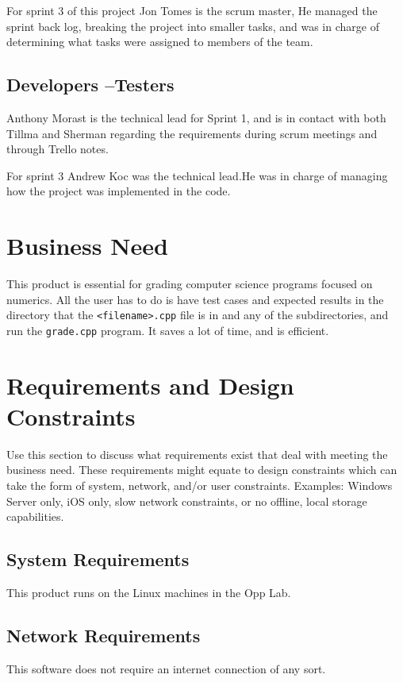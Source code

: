 For sprint 3 of this project Jon Tomes is the scrum master, He managed the sprint back log, breaking the project into smaller tasks, and was in charge of determining what tasks were assigned to members of the team.



\subsection{Developers --Testers}
Anthony Morast is the technical lead for Sprint 1, and is in contact with both Tillma and Sherman regarding the requirements during scrum meetings and through Trello notes. 

For sprint 3 Andrew Koc was the technical lead.He was in charge of managing how the project was implemented in the code. 


\section{Business Need}
This product is essential for grading computer science programs focused on numerics. All the user has to do is have test cases and expected results in the directory that the {\tt <filename>.cpp} file is in and any of the subdirectories, and run the {\tt grade.cpp} program. It saves a lot of time, and is efficient. 

\section{Requirements and Design Constraints}
Use this section to discuss what requirements exist that deal with meeting the 
business need.  These requirements might equate to design constraints which can 
take the form of system, network, and/or user constraints.  Examples:  Windows 
Server only, iOS only, slow network constraints, or no offline, local storage capabilities. 


\subsection{System  Requirements}
This product runs on the Linux machines in the Opp Lab. 


\subsection{Network Requirements}
This software does not require an internet connection of any sort. 


